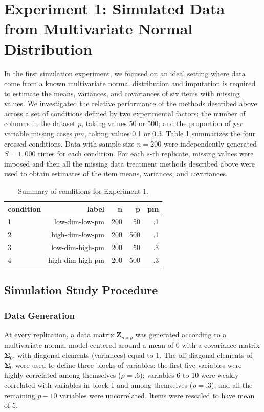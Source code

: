 \section{Experiment 1: Simulated Data from Multivariate Normal Distribution}

	In the first simulation experiment, we focused on an ideal setting where data come from a known multivariate normal 
	distribution and imputation is required to estimate the means, variances, and covariances of six items with 
	missing values.
	We investigated the relative performance of the methods described above across a set of conditions defined by two 
	experimental factors: the number of columns in the dataset $p$, taking values 50 or 500; 
	and the proportion of \emph{per} variable missing cases $pm$, taking values 0.1 or 0.3.
	Table \ref{tab:condExp1} summarizes the four crossed conditions.
	Data with sample size $n=200$ were independently generated $S = 1,000$ times for each condition.
	For each $s$-th replicate, missing values were imposed and then all the missing data treatment methods described above
	were used to obtain estimates of the item means, variances, and covariances.

\begin{table}
	\centering
	\begin{tabular}{l | r | r | r | r }
		condition & label & n & p & pm \\
		\hline
		1 & low-dim-low-pm   & 200 & 50  & .1 \\
		2 & high-dim-low-pm  & 200 & 500 & .1 \\
		3 & low-dim-high-pm  & 200 & 50  & .3 \\
		4 & high-dim-high-pm & 200 & 500 & .3 \\
	\end{tabular}
	\caption{\label{tab:condExp1}Summary of conditions for Experiment 1.}
\end{table}


\subsection{Simulation Study Procedure}

\subsubsection{Data Generation}
	At every replication, a data matrix $\bm{Z}_{n \times p}$ was generated according to a multivariate normal model 
	centered around a mean of 0 with a covariance matrix $\bm{\Sigma}_0$, with diagonal elements (variances) equal to 1.
	The off-diagonal elements of $\bm{\Sigma}_0$ were used to define three blocks of variables: 
	the first five variables were highly correlated among themselves ($\rho = .6$);
	variables 6 to 10 were weakly correlated with variables in block 1 and among themselves ($\rho = .3$), 
	and all the remaining $p-10$ variables were uncorrelated.
	Items were rescaled to have mean of 5.

